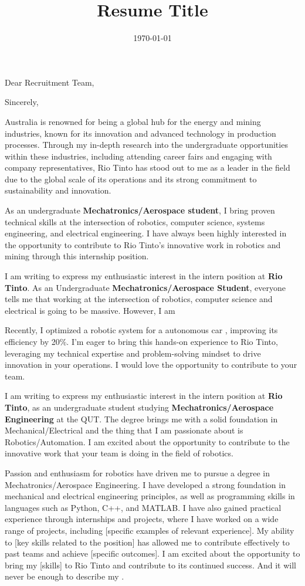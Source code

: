 \documentclass[11pt,a4paper,sans]{moderncv}        %
\title{Resume Title}                               %
\begin{document}
\date{\today}
\opening{Dear Recruitment Team,}
\closing{Sincerely,}
\makelettertitle

Australia is renowned for being a global hub for the energy and mining industries, 
known for its innovation and advanced technology in production processes. 
Through my in-depth research into the undergraduate opportunities within these industries, 
including attending career fairs and engaging with company representatives, 
Rio Tinto has stood out to me as a leader in the field due to the global scale of its operations 
and its strong commitment to sustainability and innovation.


As an undergraduate \textbf{Mechatronics/Aerospace student},
 I bring proven technical skills at the intersection of robotics, computer science, systems engineering,
 and electrical engineering. I have always been highly interested in the opportunity to contribute to Rio Tinto’s 
 innovative work in robotics and mining through this internship position.

I am writing to express my enthusiastic interest in the intern position at \textbf{Rio Tinto}. As an Undergraduate \textbf{Mechatronics/Aerospace Student}, everyone tells me that working at 
the intersection of robotics, computer science and electrical is going to be massive. However, I am 


Recently, I optimized a robotic system for a autonomous car
, improving its efficiency by 20\%. 
I’m eager to bring this hands-on experience to Rio Tinto, leveraging my technical expertise and 
problem-solving mindset to drive innovation in your operations. 
I would love the opportunity to contribute to your team.


I am writing to express my enthusiastic interest in the intern position at \textbf{Rio Tinto}, 
as an undergraduate student studying \textbf{Mechatronics/Aerospace Engineering} at the QUT. The degree brings me with a solid foundation in Mechanical/Electrical 
and the thing that I am passionate about is Robotics/Automation. I am excited about the opportunity to contribute to the innovative work that your team is doing in the field of robotics.

Passion and enthusiasm for robotics have driven me to pursue a degree in Mechatronics/Aerospace Engineering. I have developed a strong foundation in mechanical and electrical engineering principles, as well as programming skills in languages such as Python, C++, and MATLAB. I have also gained practical experience through internships and projects, where I have worked on a wide range of projects, including [specific examples of relevant experience]. My ability to [key skills related to the position] has allowed me to contribute effectively to past teams and achieve [specific outcomes]. I am excited about the opportunity to bring my [skills] to Rio Tinto and contribute to its continued success. 
And it will never be enough to describe my .
\end{document}
